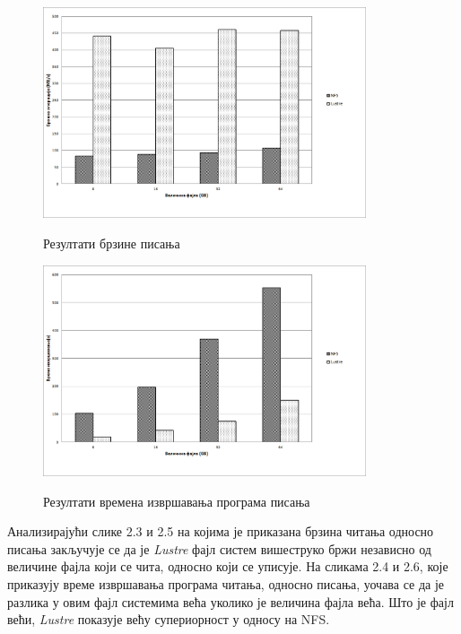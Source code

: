 \begin{figure}[H]
     \centering
         \includegraphics[width=0.85\textwidth]{slike/results/dd_write_speed.png}\\[1cm]
     \caption{Резултати брзине писања}
\end{figure}   
\begin{figure}[H]
      \centering
          \includegraphics[width=0.85\textwidth]{slike/results/dd_write_time.png}\\[1cm]
      \caption{Резултати времена извршавања програма писања}
\end{figure}   
 
Анализирајући слике 2.3 и 2.5 на којима је приказана брзина читања односно писања закључује се да је \textit{Lustre} фајл систем вишеструко бржи независно од величине фајла који се чита, односно који се уписује.
На сликама 2.4 и 2.6, које приказују време извршавања програма читања, односно писања, уочава се да је разлика у овим фајл системима већа уколико је величина фајла већа. Што је фајл већи, \textit{Lustre} показује већу супериорност у односу на NFS.

